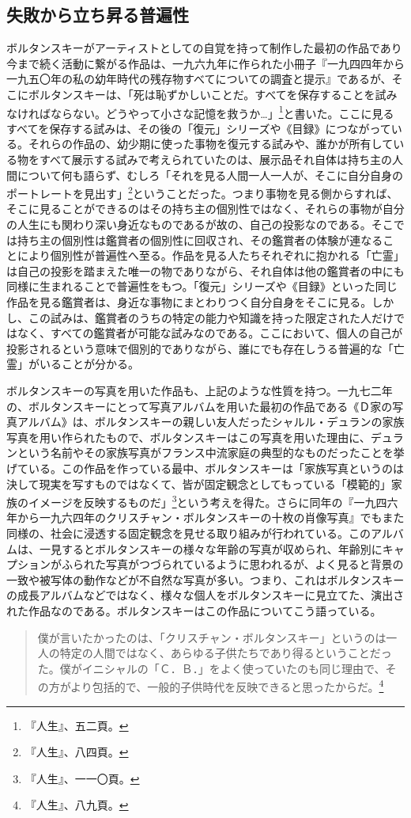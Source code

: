 \documentclass[b5j,twoside,twocolumn]{utarticle}
\begin{document}
\subsection{失敗から立ち昇る普遍性}
ボルタンスキーがアーティストとしての自覚を持って制作した最初の作品であり今まで続く活動に繋がる作品は、一九六九年に作られた小冊子『一九四四年から一九五〇年の私の幼年時代の残存物すべてについての調査と提示』であるが、そこにボルタンスキーは、「死は恥ずかしいことだ。すべてを保存することを試みなければならない。どうやって小さな記憶を救うか…」\footnote{『人生』、五二頁。}と書いた。ここに見るすべてを保存する試みは、その後の「復元」シリーズや《目録》につながっている。それらの作品の、幼少期に使った事物を復元する試みや、誰かが所有している物をすべて展示する試みで考えられていたのは、展示品それ自体は持ち主の人間について何も語らず、むしろ「それを見る人間一人一人が、そこに自分自身のポートレートを見出す」\footnote{『人生』、八四頁。}ということだった。つまり事物を見る側からすれば、そこに見ることができるのはその持ち主の個別性ではなく、それらの事物が自分の人生にも関わり深い身近なものであるが故の、自己の投影なのである。そこでは持ち主の個別性は鑑賞者の個別性に回収され、その鑑賞者の体験が連なることにより個別性が普遍性へ至る。作品を見る人たちそれぞれに抱かれる「亡霊」は自己の投影を踏まえた唯一の物でありながら、それ自体は他の鑑賞者の中にも同様に生まれることで普遍性をもつ。「復元」シリーズや《目録》といった同じ作品を見る鑑賞者は、身近な事物にまとわりつく自分自身をそこに見る。しかし、この試みは、鑑賞者のうちの特定の能力や知識を持った限定された人だけではなく、すべての鑑賞者が可能な試みなのである。ここにおいて、個人の自己が投影されるという意味で個別的でありながら、誰にでも存在しうる普遍的な「亡霊」がいることが分かる。


ボルタンスキーの写真を用いた作品も、上記のような性質を持つ。一九七二年の、ボルタンスキーにとって写真アルバムを用いた最初の作品である《Ｄ家の写真アルバム》は、ボルタンスキーの親しい友人だったシャルル・デュランの家族写真を用い作られたもので、ボルタンスキーはこの写真を用いた理由に、デュランという名前やその家族写真がフランス中流家庭の典型的なものだったことを挙げている。この作品を作っている最中、ボルタンスキーは「家族写真というのは決して現実を写すものではなくて、皆が固定観念としてもっている「模範的」家族のイメージを反映するものだ」\footnote{『人生』、一一〇頁。}という考えを得た。さらに同年の『一九四六年から一九六四年のクリスチャン・ボルタンスキーの十枚の肖像写真』でもまた同様の、社会に浸透する固定観念を見せる取り組みが行われている。このアルバムは、一見するとボルタンスキーの様々な年齢の写真が収められ、年齢別にキャプションがふられた写真がつづられているように思われるが、よく見ると背景の一致や被写体の動作などが不自然な写真が多い。つまり、これはボルタンスキーの成長アルバムなどではなく、様々な個人をボルタンスキーに見立てた、演出された作品なのである。ボルタンスキーはこの作品についてこう語っている。
\begin{quote}
僕が言いたかったのは、「クリスチャン・ボルタンスキー」というのは一人の特定の人間ではなく、あらゆる子供たちであり得るということだった。僕がイニシャルの「Ｃ．Ｂ．」をよく使っていたのも同じ理由で、その方がより包括的で、一般的子供時代を反映できると思ったからだ。\footnote{『人生』、八九頁。}
\end{quote}
\end{document}

